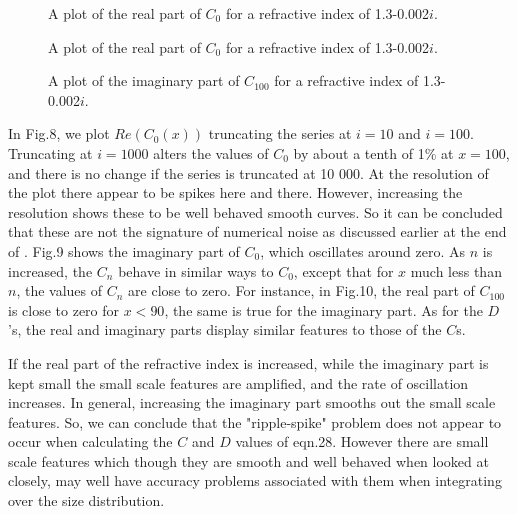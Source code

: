 \vspace*{14cm}
\begin{figure}[htb]
\caption{ A plot of the real part of $C_0$ for a refractive index of
1.3-0.002$i$. }
\end{figure}

\vspace*{14cm}
\begin{figure}[htb]
\caption{ A plot of the real part of $C_0$ for a refractive index of
1.3-0.002$i$. }
\end{figure}
\vspace*{14cm}
\begin{figure}[htb]
\caption{ A plot of the imaginary  part of $C_{100}$ for a refractive index of
1.3-0.002$i$. }
\end{figure}

In Fig.8, we plot $Re(C_0(x))$ truncating the series at $i=10$ and $i=100$.
Truncating at $i=1000$ alters the values of $C_0$ by about a tenth of 1\% at $x=100$,
and there is no change if the series is truncated at 10 000.  At the resolution
of the plot there appear to be spikes here and there. However, increasing the resolution
shows these to be well behaved smooth curves. So it can be concluded that these
are not the signature of numerical noise as discussed earlier at the end of .
 Fig.9 shows the imaginary
part of $C_0$, which oscillates around zero. As $n$ is increased, the $C_n$ behave 
in similar ways to $C_0$, except that for $x$  much less than $n$, the values of
$C_n$ are close to zero. For instance, in Fig.10, the real part of $C_{100}$ is close to zero
for $x <90$, the same is true for the imaginary part. As for the $D$'s, the real
and imaginary parts display similar features to those of the $C$s.

If the real part of the refractive index is increased, while the imaginary part is kept 
small the small scale features are amplified, and the rate of oscillation increases. In 
general, increasing the imaginary part smooths out the small scale features.
So, we can conclude that
the "ripple-spike" problem does not appear to occur when calculating the $C$ and $D$ values
of eqn.28. 
However there are small scale features which though they are smooth and well behaved
 when looked at closely,
may well  have accuracy problems associated with them when integrating over the size distribution.

